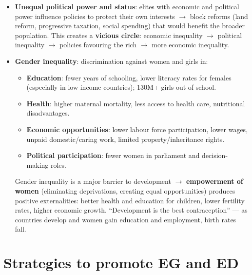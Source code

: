 \begin{itemize}
  \item \textbf{Unequal political power and status}: elites with economic and political power influence policies to protect their own interests $\to$ block reforms (land reform, progressive taxation, social spending) that would benefit the broader population. This creates a \textbf{vicious circle}: economic inequality $\to$ political inequality $\to$ policies favouring the rich $\to$ more economic inequality.
  \item \textbf{Gender inequality}: discrimination against women and girls in:
  \begin{itemize}
    \item \textbf{Education}: fewer years of schooling, lower literacy rates for females (especially in low-income countries); 130M+ girls out of school.
    \item \textbf{Health}: higher maternal mortality, less access to health care, nutritional disadvantages.
    \item \textbf{Economic opportunities}: lower labour force participation, lower wages, unpaid domestic/caring work, limited property/inheritance rights.
    \item \textbf{Political participation}: fewer women in parliament and decision-making roles.
  \end{itemize}
  Gender inequality is a major barrier to development $\to$ \textbf{empowerment of women} (eliminating deprivations, creating equal opportunities) produces positive externalities: better health and education for children, lower fertility rates, higher economic growth. ``Development is the best contraception'' --- as countries develop and women gain education and employment, birth rates fall.
\end{itemize}
\section{Strategies to promote EG and ED}\label{sec:strategies}
